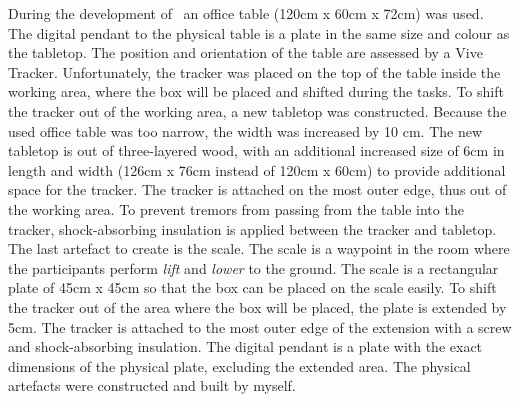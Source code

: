 During the development of \exgo\, an office table (120cm x 60cm x 72cm) was used. The digital pendant to the physical table is a plate in the same size and colour as the tabletop. The position and orientation of the table are assessed by a Vive Tracker. Unfortunately, the tracker was placed on the top of the table inside the working area, where the box will be placed and shifted during the tasks. To shift the tracker out of the working area, a new tabletop was constructed. Because the used office table was too narrow, the width was increased by 10 cm. The new tabletop is out of three-layered wood, with an additional increased size of 6cm in length and width (126cm x 76cm instead of 120cm x 60cm) to provide additional space for the tracker. The tracker is attached on the most outer edge, thus out of the working area. To prevent tremors from passing from the table into the tracker, shock-absorbing insulation is applied between the tracker and tabletop.\\
The last artefact to create is the scale. The scale is a waypoint in the room where the participants perform \textit{lift} and \textit{lower} to the ground. The scale is a rectangular plate of 45cm x 45cm so that the box can be placed on the scale easily. To shift the tracker out of the area where the box will be placed, the plate is extended by 5cm. The tracker is attached to the most outer edge of the extension with a screw and shock-absorbing insulation. The digital pendant is a plate with the exact dimensions of the physical plate, excluding the extended area. The physical artefacts were constructed and built by myself.\\


